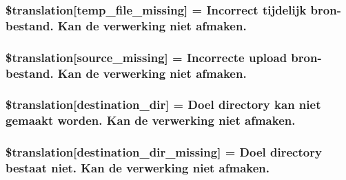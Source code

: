 \subsubsection[{\$translation}]{\setlength{\rightskip}{0pt plus 5cm}\$translation\mbox{[}\textquotesingle{}temp\+\_\+file\+\_\+missing\textquotesingle{}\mbox{]} = \textquotesingle{}Incorrect tijdelijk bron-\/bestand. Kan de verwerking niet afmaken.\textquotesingle{}}\label{class_8upload_8nl___n_l_8php_ab0fa87a88aba2624004581eed0633325}
\hypertarget{class_8upload_8nl___n_l_8php_aceaaf7355acaaf10f0ae60378d03c468}{}
\subsubsection[{\$translation}]{\setlength{\rightskip}{0pt plus 5cm}\$translation\mbox{[}\textquotesingle{}source\+\_\+missing\textquotesingle{}\mbox{]} = \textquotesingle{}Incorrecte {\bf upload} bron-\/bestand. Kan de verwerking niet afmaken.\textquotesingle{}}\label{class_8upload_8nl___n_l_8php_aceaaf7355acaaf10f0ae60378d03c468}
\hypertarget{class_8upload_8nl___n_l_8php_aff2427c72a2598aefa6d58df1dd18b08}{}
\subsubsection[{\$translation}]{\setlength{\rightskip}{0pt plus 5cm}\$translation\mbox{[}\textquotesingle{}destination\+\_\+dir\textquotesingle{}\mbox{]} = \textquotesingle{}Doel directory kan niet gemaakt worden. Kan de verwerking niet afmaken.\textquotesingle{}}\label{class_8upload_8nl___n_l_8php_aff2427c72a2598aefa6d58df1dd18b08}
\hypertarget{class_8upload_8nl___n_l_8php_a9ef28d3cf09942c6c0a1e77fa09185e8}{}
\subsubsection[{\$translation}]{\setlength{\rightskip}{0pt plus 5cm}\$translation\mbox{[}\textquotesingle{}destination\+\_\+dir\+\_\+missing\textquotesingle{}\mbox{]} = \textquotesingle{}Doel directory bestaat niet. Kan de verwerking niet afmaken.\textquotesingle{}}\label{class_8upload_8nl___n_l_8php_a9ef28d3cf09942c6c0a1e77fa09185e8}
\hypertarget{class_8upload_8nl___n_l_8php_a5704a67137126e8c87b7a364175929d4}{}
